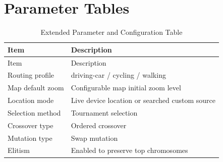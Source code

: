 \documentclass[12pt,a4paper]{report}
\begin{document}
\chapter{Parameter Tables}
\begin{longtable}{p{}p{}}
\caption{Extended Parameter and Configuration Table}\\
\toprule
Item & Description \\
\midrule
\endfirsthead
\toprule
Item & Description \\
\midrule
\endhead
Routing profile & driving-car / cycling / walking \\
Map default zoom & Configurable map initial zoom level \\
Location mode & Live device location or searched custom source \\
Selection method & Tournament selection \\
Crossover type & Ordered crossover \\
Mutation type & Swap mutation \\
Elitism & Enabled to preserve top chromosomes \\
\bottomrule
\end{longtable}
\end{document}
